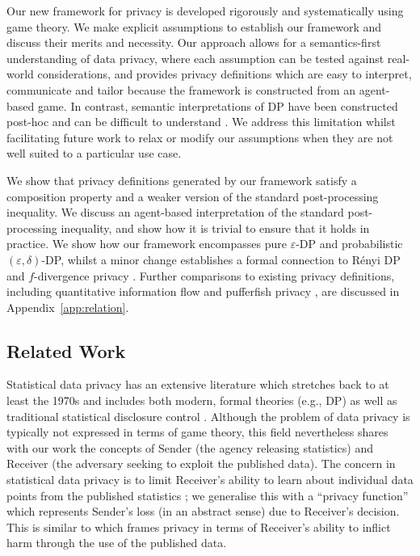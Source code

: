 \documentclass{article}
\theoremstyle{plain}
\theoremstyle{plain}
\theoremstyle{definition}
\theoremstyle{remark}
\theoremstyle{plain}
\begin{document}
Our new framework for privacy is developed rigorously and systematically using game theory. We make explicit assumptions to establish our framework and discuss their merits and necessity. Our approach allows for a semantics-first understanding of data privacy, where each assumption can be tested against real-world considerations, and provides privacy definitions which are easy to interpret, communicate and tailor because the framework is constructed from an agent-based game.  
In contrast, semantic interpretations of DP have been constructed post-hoc \citep{kasiviswanathanSemanticsDifferentialPrivacy2014, wassermanStatisticalFrameworkDifferential2010} 
and can be difficult to understand \citep{nanayakkaraWhatAreChances2023a, cummingsNeedBetterDescription2021}. 
We address this limitation whilst facilitating future work to relax or modify our assumptions when they are not well suited to a particular use case.

We show that privacy definitions generated by our framework satisfy a composition property and a weaker version of the standard post-processing inequality. We discuss an agent-based interpretation of the standard post-processing inequality, and show how it is trivial to ensure that it holds in practice. We show how our framework encompasses pure $\varepsilon$-DP and probabilistic $(\varepsilon, \delta)$-DP, whilst a minor change establishes a formal connection to R\'{e}nyi DP \citep{mironov2017renyi} and $f$-divergence privacy \citep{barberPrivacyStatisticalRisk2014, bartheDifferentialPrivacyComposition2013}. Further comparisons to existing privacy definitions, including quantitative information flow \citep{alvimScienceQuantitativeInformation2020} and pufferfish privacy \citep{kiferPufferfishFrameworkMathematical2014}, are discussed in Appendix~\ref{app:relation}.

\subsection{Related Work}

Statistical data privacy \citep{slavkovicStatisticalDataPrivacy2023} has an extensive literature which stretches back to at least the 1970s \citep{daleniusMethodologyStatisticalDisclosure1977} and includes both modern, formal theories (e.g., DP) as well as traditional statistical disclosure control \citep[SDC,][]{hundepoolStatisticalDisclosureControl2012, willenborgElementsStatisticalDisclosure2001}. Although the problem of data privacy is typically not expressed in terms of game theory, this field nevertheless shares with our work the concepts of Sender (the agency releasing statistics) and Receiver (the adversary seeking to exploit the published data). The concern in statistical data privacy is to limit Receiver's ability to learn about individual data points from the published statistics \citep{duncanDisclosurelimitedDataDissemination1986, dworkDifficultiesDisclosurePrevention2010}; we generalise this with a ``privacy function'' which represents Sender's loss (in an abstract sense) due to Receiver's decision. This is similar to \citet{bunEnforcingDemographicCoherence2025} which frames privacy in terms of Receiver's ability to inflict harm through the use of the published data.
\end{document}
